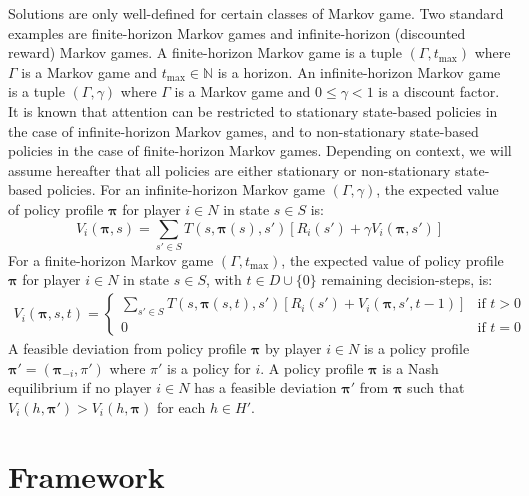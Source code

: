\documentclass[10pt]{article}
\theoremstyle{plain}
\newcommand{\vect}[1]{\bm{#1}}
\begin{document}
Solutions are only well-defined for certain classes of Markov game.
Two standard examples are finite-horizon Markov games and infinite-horizon (discounted reward) Markov games.
A finite-horizon Markov game is a tuple $(\Gamma, t_{\max})$ where $\Gamma$ is a Markov game and $t_{\max} \in \mathbb{N}$ is a horizon.
An infinite-horizon Markov game is a tuple $(\Gamma, \gamma)$ where $\Gamma$ is a Markov game and $0 \le \gamma < 1$ is a discount factor.
It is known that attention can be restricted to stationary state-based policies in the case of infinite-horizon Markov games, and to non-stationary state-based policies in the case of finite-horizon Markov games.
Depending on context, we will assume hereafter that all policies are either stationary or non-stationary state-based policies.
For an infinite-horizon Markov game $(\Gamma, \gamma)$, the expected value of policy profile $\vect{\pi}$ for player $i \in N$ in state $s \in S$ is:
\begin{equation*}
    V_{i}(\vect{\pi}, s) = \sum_{s' \in S} T(s, \vect{\pi}(s), s') \left[ R_{i}(s') + \gamma V_{i}(\vect{\pi}, s') \right]
\end{equation*}
For a finite-horizon Markov game $(\Gamma, t_{\max})$, the expected value of policy profile $\vect{\pi}$ for player $i \in N$ in state $s \in S$, with $t \in D \cup \{ 0 \}$ remaining decision-steps, is:
\begin{align*}
    V_{i}(\vect{\pi}, s, t) =
    \begin{cases}
        \sum\limits_{s' \in S} T(s, \vect{\pi}(s, t), s') \left[ R_{i}(s') + V_{i}(\vect{\pi}, s', t-1) \right] & \text{if $t > 0$} \\
        0 & \text{if $t = 0$}
    \end{cases}
\end{align*}
A feasible deviation from policy profile $\vect{\pi}$ by player $i \in N$ is a policy profile $\vect{\pi'} = (\vect{\pi}_{-i}, \pi')$ where $\pi'$ is a policy for $i$.
A policy profile $\vect{\pi}$ is a Nash equilibrium if no player $i \in N$ has a feasible deviation $\vect{\pi'}$ from $\vect{\pi}$ such that $V_{i}(h, \vect{\pi'}) > V_{i}(h, \vect{\pi})$ for each $h \in H'$.

\newpage
\section{Framework}\label{section:framework}
\end{document}

